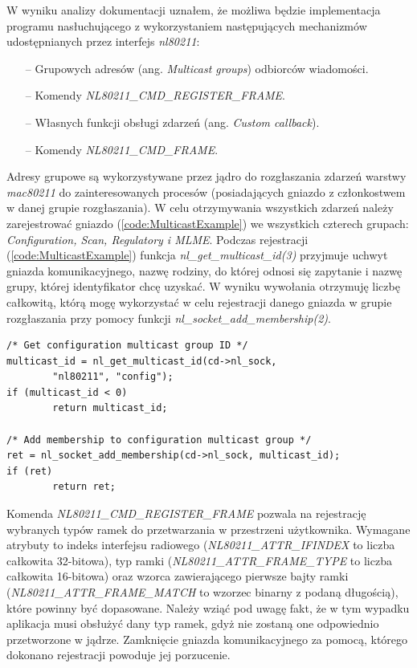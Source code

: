 W wyniku analizy dokumentacji uznałem, że możliwa będzie implementacja programu nasłuchującego z wykorzystaniem następujących mechanizmów udostępnianych przez interfejs \emph{nl80211}:

\begin{itemize}
\item[--] Grupowych adresów (ang. \emph{Multicast groups}) odbiorców wiadomości.
\item[--] Komendy \emph{NL80211\_CMD\_REGISTER\_FRAME}.
\item[--] Własnych funkcji obsługi zdarzeń (ang. \emph{Custom callback}).
\item[--] Komendy \emph{NL80211\_CMD\_FRAME}.
\end{itemize}

Adresy grupowe są wykorzystywane przez jądro do rozgłaszania zdarzeń warstwy \emph{mac80211} do zainteresowanych procesów (posiadających gniazdo z członkostwem w danej grupie rozgłaszania). W celu otrzymywania wszystkich zdarzeń należy zarejestrować gniazdo (\ref{code:MulticastExample}) we wszystkich czterech grupach: \emph{Configuration, Scan, Regulatory i MLME}. Podczas rejestracji (\ref{code:MulticastExample}) funkcja \emph{nl\_get\_multicast\_id(3)} przyjmuje uchwyt gniazda komunikacyjnego, nazwę rodziny, do której odnosi się zapytanie i nazwę grupy, której identyfikator chcę uzyskać. W wyniku wywołania otrzymuję liczbę całkowitą, którą mogę wykorzystać w celu rejestracji danego gniazda w grupie rozgłaszania przy pomocy funkcji \emph{nl\_socket\_add\_membership(2)}.

\begin{lstlisting}[frame=tb]
/* Get configuration multicast group ID */
multicast_id = nl_get_multicast_id(cd->nl_sock, 
        "nl80211", "config");
if (multicast_id < 0)
        return multicast_id;
                                        
/* Add membership to configuration multicast group */
ret = nl_socket_add_membership(cd->nl_sock, multicast_id);
if (ret)
        return ret;
\end{lstlisting}

Komenda \emph{NL80211\_CMD\_REGISTER\_FRAME} pozwala na rejestrację wybranych typów ramek do przetwarzania w przestrzeni użytkownika. Wymagane atrybuty to indeks interfejsu radiowego (\emph{NL80211\_ATTR\_IFINDEX} to liczba całkowita 32-bitowa), typ ramki (\emph{NL80211\_ATTR\_FRAME\_TYPE} to liczba całkowita 16-bitowa) oraz wzorca zawierającego pierwsze bajty ramki (\emph{NL80211\_ATTR\_FRAME\_MATCH} to wzorzec binarny z podaną długością), które powinny być dopasowane. Należy wziąć pod uwagę fakt, że w tym wypadku aplikacja musi obsłużyć dany typ ramek, gdyż nie zostaną one odpowiednio przetworzone w jądrze. Zamknięcie gniazda komunikacyjnego za pomocą, którego dokonano rejestracji powoduje jej porzucenie. 

